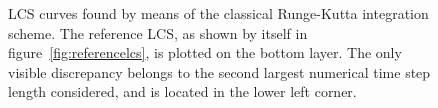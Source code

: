\begin{figure}[htpb]
    \centering
    
    \caption[LCS curves found by means of the classical Runge-Kutta integration scheme]{
        LCS curves found by means of the classical Runge-Kutta integration scheme. The
        reference LCS, as shown by itself in figure~\ref{fig:referencelcs},
        is plotted on the bottom layer. The only visible discrepancy belongs
        to the second largest numerical time step length considered, and is
        located in the lower left corner.}
    \label{fig:lcs_rk4}
\end{figure}
